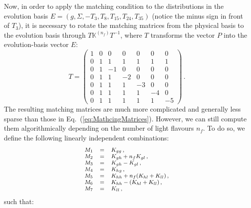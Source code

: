 \documentclass[10pt,a4paper]{article}
\begin{document}
Now, in order to apply the matching condition to the distributions in
the evolution basis $E=(g,\Sigma,-T_3,T_8,T_{15},T_{24},T_{35})$
(notice the minus sign in front of $T_3$), it is necessary to rotate
the matching matrices from the physical basis to the evolution basis
through $T\mathbb{K}^{(n_f)}T^{-1}$, where $T$ transforms the vector
$P$ into the evolution-basis vector $E$:
\begin{equation}\label{eq:RotationMatrix}
T = 
\begin{pmatrix}
1 & 0 & 0  & 0  & 0  & 0  & 0 \\
0 & 1 & 1  & 1  & 1  & 1  & 1 \\
0 & 1 & -1  & 0  & 0  & 0  & 0 \\
0 & 1 & 1  & -2  & 0  & 0  & 0 \\
0 & 1 & 1  & 1  & -3  & 0  & 0 \\
0 & 1 & 1  & 1  & 1  & -4  & 0 \\
0 & 1 & 1  & 1  & 1  & 1  & -5
\end{pmatrix}\,.
\end{equation}
The resulting matching matrices are much more complicated and
generally less sparse than those in
Eq.~(\ref{eq:MathcingMatrices}). However, we can still compute them
algorithmically depending on the number of light flavours $n_f$. To do
so, we define the following linearly independent combinations:
\begin{equation}
\footnotesize
\begin{array}{lcl}
M_1 &=& K_{gg}\,,\\
M_2 &=& K_{gh} + n_f K_{gl}\,,\\
M_3 &=& K_{gh}-K_{gl}\,,\\
M_4 &=& K_{hg}\,,\\
M_5 &=& K_{hh}+n_f(K_{hl}+K_{ll}) \,,\\
M_6 &=& K_{hh}-(K_{hl}+K_{ll})\,,\\
M_7 &=& K_{ll}\,,
\end{array}
\end{equation}
such that:
\end{document}
